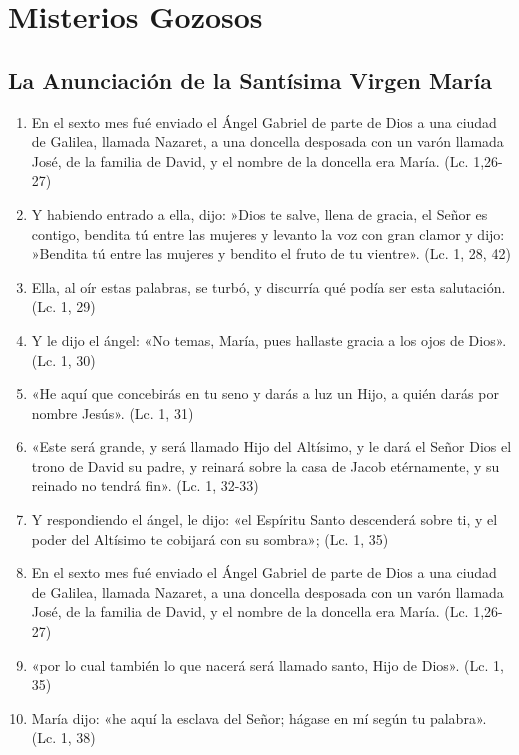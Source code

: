 \documentclass[a4paper,11pt]{article}
\begin{document}
  \section*{\hfil Misterios Gozosos \hfil}
    
    \subsection*{\hfil La Anunciación de la Santísima Virgen María \hfil}

      \begin{enumerate}
        \item En el sexto mes fué enviado el Ángel Gabriel de parte de Dios a una ciudad de Galilea, llamada Nazaret, a una 
        doncella desposada con un varón llamada José, de la familia de David, y el nombre de la doncella era María. (Lc. 1,26- 27)

        \item Y habiendo entrado a ella, dijo: »Dios te salve, llena de gracia, el Señor es contigo, bendita tú entre las mujeres 
        y levanto la voz con gran clamor y dijo: »Bendita tú entre las mujeres y bendito el fruto de tu vientre». (Lc. 1, 28, 42)

        \item Ella, al oír estas palabras, se turbó, y discurría qué podía ser esta salutación. (Lc. 1, 29)

        \item Y le dijo el ángel: «No temas, María, pues hallaste gracia a los ojos de Dios». (Lc. 1, 30)

        \item «He aquí que concebirás en tu seno y darás a luz un Hijo, a quién darás por nombre Jesús». (Lc. 1, 31)

        \item «Este será grande, y será llamado Hijo del Altísimo, y le dará el Señor Dios el trono de David su padre, 
        y reinará sobre la casa de Jacob etérnamente, y su reinado no tendrá fin». (Lc. 1, 32-33)

        \item Y respondiendo el ángel, le dijo: «el Espíritu Santo descenderá sobre ti, 
        y el poder del Altísimo te cobijará con su sombra»; (Lc. 1, 35)
        
        \item En el sexto mes fué enviado el Ángel Gabriel de parte de Dios a una ciudad de Galilea, llamada Nazaret, a una 
        doncella desposada con un varón llamada José, de la familia de David, y el nombre de la doncella era María. (Lc. 1,26- 27)

        \item «por lo cual también lo que nacerá será llamado santo, Hijo de Dios». (Lc. 1, 35)

        \item María dijo: «he aquí la esclava del Señor; hágase en mí según tu palabra». (Lc. 1, 38)

      \end{enumerate}
            
\end{document}
